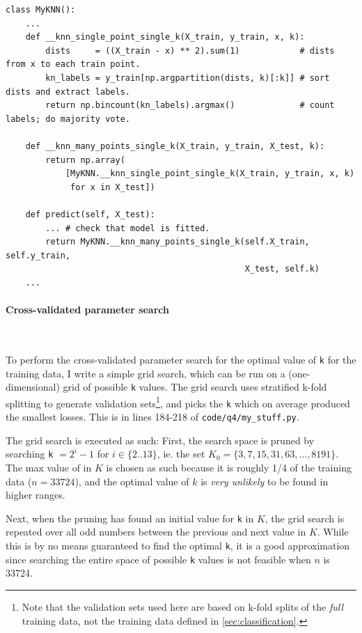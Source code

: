 \begin{verbatim}
class MyKNN():
    ...
    def __knn_single_point_single_k(X_train, y_train, x, k):
        dists     = ((X_train - x) ** 2).sum(1)            # dists from x to each train point.
        kn_labels = y_train[np.argpartition(dists, k)[:k]] # sort dists and extract labels.
        return np.bincount(kn_labels).argmax()             # count labels; do majority vote.

    def __knn_many_points_single_k(X_train, y_train, X_test, k):
        return np.array(
            [MyKNN.__knn_single_point_single_k(X_train, y_train, x, k)
             for x in X_test])

    def predict(self, X_test):
        ... # check that model is fitted.
        return MyKNN.__knn_many_points_single_k(self.X_train, self.y_train,
                                                X_test, self.k)
    ...
\end{verbatim}

\paragraph{Cross-validated parameter search}~

To perform the cross-validated parameter search for the optimal value of
\texttt{k} for the training data, I write a simple grid search, which can be run
on a (one-dimensional) grid of possible \texttt{k} values. The grid search uses
stratified k-fold splitting to generate validation sets\footnote{Note that the
validation sets used here are based on k-fold splits of the \textit{full}
training data, not the training data defined in \cref{sec:classification}.}, and
picks the \texttt{k} which on average produced the smallest losses. This is in
lines 184-218 of \texttt{code/q4/my\_stuff.py}.


The grid search is executed as such: First, the search space is pruned by
searching \texttt{k} $ = 2^i - 1$ for $i \in \{2..13\}$, ie. the set $K_0 = \{3,
7, 15, 31, 63, ..., 8191\}$. The max value of in $K$ is chosen as such because
it is roughly 1/4 of the training data ($n = 33724$), and the optimal value of
$k$ is \textit{very unlikely} to be found in higher ranges.

Next, when the pruning has found an initial value for \texttt{k} in $K$, the
grid search is repeated over all odd numbers between the previous and next value
in $K$. While this is by no means guaranteed to find the optimal \texttt{k}, it
is a good approximation since searching the entire space of possible \texttt{k}
values is not feasible when $n$ is 33724.

